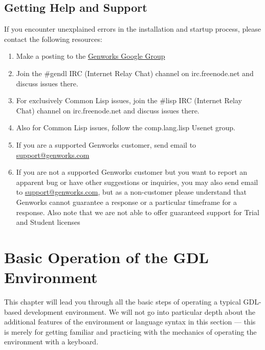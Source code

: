 \documentclass [11pt]{book}
\begin{document}
\section{Getting Help and Support}

\label{sec:gettinghelpandsupport}

If you encounter unexplained errors in the installation and
startup process, please contact the following resources:

\begin{enumerate}

\item Make a posting to the \href{http://groups.google.com/group/genworks}{Genworks Google Group}

\item Join the \#gendl IRC (Internet Relay Chat) channel on
	irc.freenode.net and discuss issues there.

\item For exclusively Common Lisp issues, join the \#lisp
	IRC (Internet Relay Chat) channel on irc.freenode.net and
	discuss issues there.

\item Also for Common Lisp issues, follow the comp.lang.lisp
	Usenet group.

\item If you are a supported Genworks customer, send email to \href{mailto:support@genworks.com}{support@genworks.com}

\item If you are not a supported Genworks customer but you want to report an apparent bug or have other suggestions or inquiries, you may also send email to \href{mailto:support@genworks.com}{support@genworks.com}, but as a non-customer please understand that Genworks
	  cannot guarantee a response or a particular timeframe for a
	  response. Also note that we are not able to offer guaranteed
	  support for Trial and Student licenses 

\end{enumerate}



\chapter{Basic Operation of the GDL Environment}

\label{chap:basicoperationofthegdlenvironment}

This chapter will lead you through all the basic steps of
operating a typical GDL-based development environment. We will not go
into particular depth about the additional features of the environment
or language syntax in this section --- this is merely for getting
familiar and practicing with the mechanics of operating the
environment with a keyboard.
\end{document}
